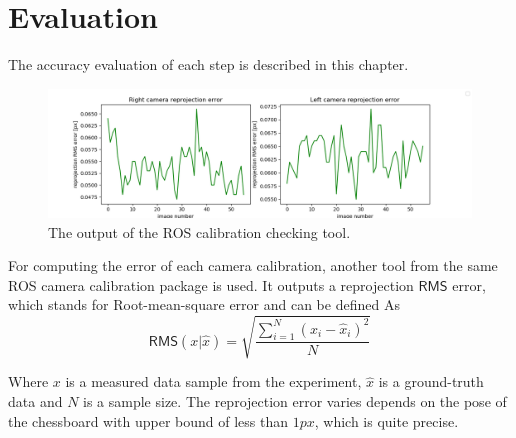 \chapter{Evaluation}
\label{chapter:evaluation}

The accuracy evaluation of each step is described in this chapter.

\begin{figure}[h]
    \centering
    \includegraphics[width=\textwidth]{graphics/single_cam_calib.png}
    \caption{The output of the ROS calibration checking tool.}
    \label{fig:camcheck}
\end{figure}

For computing the error of each camera calibration, another tool from the same ROS camera calibration package is used.
It outputs a reprojection $\mathsf{RMS}$ error, which stands for Root-mean-square error and can be defined As
\begin{equation}
    \mathsf{RMS}(x | \hat{x} ) = \sqrt{\frac{\sum_{i=1}^{N}{(x_i - \hat{x}_i)^2}}{N}}
\end{equation}

Where $x$ is a measured data sample from the experiment, $\hat{x}$ is a ground-truth data and $N$ is a sample size.
The reprojection error varies depends on the pose of the chessboard with upper bound of less than $1px$, which is quite precise.
